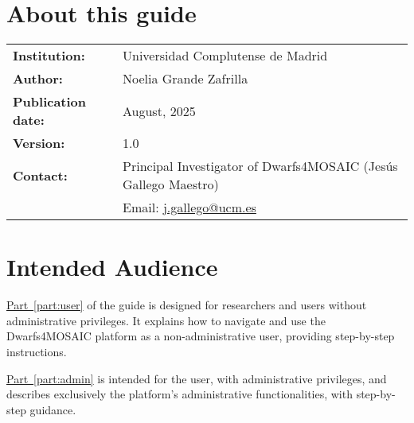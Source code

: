 



\newcommand{\project}{\textsf{Dwarfs4MOSAIC}\xspace}
\newcommand{\prjInstitution}{Universidad Complutense de Madrid}
\newcommand{\prjAuthor}{Noelia Grande Zafrilla}
\newcommand{\prjPubDate}{August, 2025} %
\newcommand{\prjVersion}{1.0}
\newcommand{\prjContact}{Principal Investigator of Dwarfs4MOSAIC (Jesús Gallego Maestro)}
\newcommand{\prjMail}{j.gallego@ucm.es}



	
	\pagestyle{empty}   %
	
	
	
	\setlength{\parskip}{1em}    %
	\setlength{\parindent}{0pt}  %
	
	\section*{About this guide}
	
	\begin{flushleft}
		\begin{tabular}{ll}
			\textbf{Institution:} & \prjInstitution \\
			\textbf{Author:} & \prjAuthor \\
			\textbf{Publication date:} & \prjPubDate \\
			\textbf{Version:} & 1.0 \\
			\textbf{Contact:} & \prjContact \\
			& Email: \href{mailto:\prjMail}{\prjMail}
		\end{tabular}
	\end{flushleft}
	
	\vspace{2cm}
	
	\section*{Intended Audience}
	
	\hyperref[part:user]{Part~\ref*{part:user}} of the guide is designed for researchers and users without administrative privileges. It explains how to navigate and use the \project platform as a non-administrative user, providing step-by-step instructions.
	
	\hyperref[part:admin]{Part~\ref*{part:admin}} is intended for the \admin user, with administrative privileges, and describes exclusively the platform’s administrative functionalities, with step-by-step guidance.
	 
